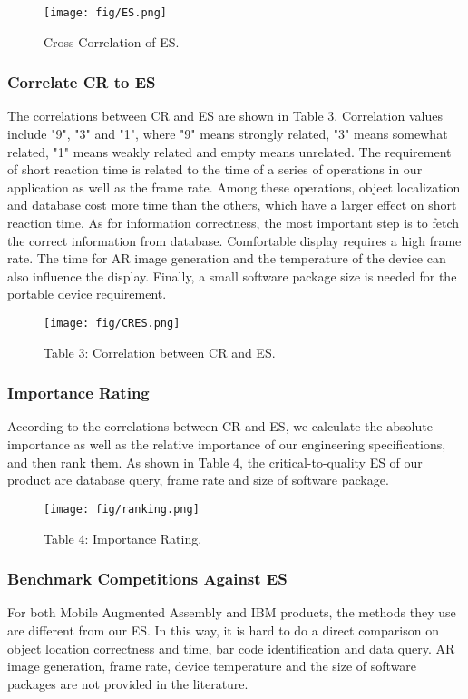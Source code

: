 \documentclass[11pt,a4paper]{article}
\begin{document}
\begin{onehalfspace}
\begin{figure}[H]
    \centering
    \texttt{[image: fig/ES.png]}
    \caption{Cross Correlation of ES.}
    \label{fig:ES}
\end{figure}

\subsubsection{Correlate CR to ES}

The correlations between CR and ES are shown in Table 3. 
Correlation values include "9", "3" and "1", where "9" means strongly related, "3" means somewhat related, "1" means weakly related and empty means unrelated. The requirement of short reaction time is related to the time of a series of operations in our application as well as the frame rate. Among these operations, object localization and database cost more time than the others, which have a larger effect on short reaction time. As for information correctness, the most important step is to fetch the correct information from database. Comfortable display requires a high frame rate. The time for AR image generation and the temperature of the device can also influence the display. Finally, a small software package size is needed for the portable device requirement.

\begin{figure}[H]
    \centering
    \caption*{Table 3: Correlation between CR and ES.}
    \texttt{[image: fig/CRES.png]}
\end{figure}

\subsubsection{Importance Rating}

According to the correlations between CR and ES, we calculate the absolute importance as well as the relative importance of our engineering specifications, and then rank them. As shown in Table 4, the critical-to-quality ES of our product are database query, frame rate and size of software package.

\begin{figure}[H]
    \centering
    \caption*{Table 4: Importance Rating.}
    \texttt{[image: fig/ranking.png]}
\end{figure}

\subsubsection{Benchmark Competitions Against ES}
For both Mobile Augmented Assembly and IBM products, the methods they use are different from our ES. In this way, it is hard to do a direct comparison on object location correctness and time, bar code identification and data query. AR image generation, frame rate, device temperature and the size of software packages are not provided in the literature.


\end{onehalfspace}
\end{document}
